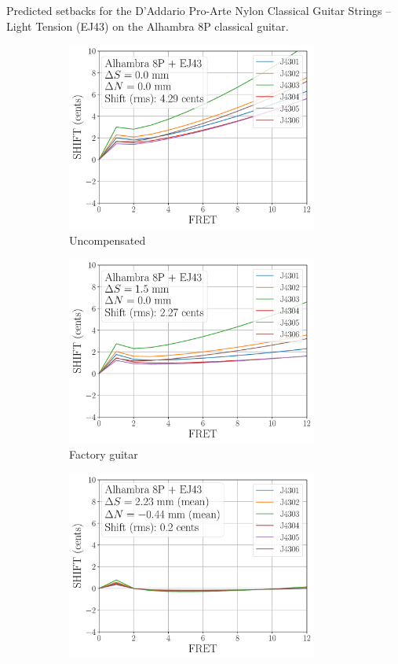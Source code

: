  \begin{table}[htbp]
  \centering
  \caption{\label{tbl:ej43_setbacks} Predicted setbacks for the D'Addario Pro-Arte Nylon Classical Guitar Strings -- Light Tension (EJ43) on the Alhambra 8P classical guitar.}
  
 \end{table}%

 \begin{figure}
  \centering
  \begin{subfigure}[b]{0.45\textwidth}
   \centering
   \includegraphics[width=3.25in]{../figures/shift_alhambra8p_ej43_null}
   \caption{Uncompensated}
   \label{fig:shift_alhambra8p_ej43_null}
  \end{subfigure}
  \hspace{0.25in}
  \begin{subfigure}[b]{0.45\textwidth}
   \centering
   \includegraphics[width=3.25in]{../figures/shift_alhambra8p_ej43_factory}
   \caption{Factory guitar}
   \label{fig:shift_alhambra8p_ej43_factory}
  \end{subfigure}
  \par\vspace{0.25in}
  \begin{subfigure}[b]{0.45\textwidth}
   \centering
   \includegraphics[width=3.25in]{../figures/shift_alhambra8p_ej43_full}

\end{subfigure}
\end{figure}
